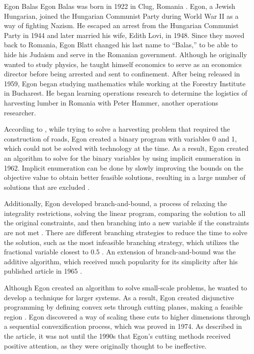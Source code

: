 \begin{refsection}
\begin{pioneerspotlight}{Egon Balas}
Egon Balas was born in 1922 in Clug, Romania \parencite{cornuejols_2019_egon}. Egon, a Jewish Hungarian, joined the Hungarian Communist Party during World War II as a way of fighting Nazism. He escaped an arrest from the Hungarian Communist Party in 1944 and later married his wife, Edith Lovi, in 1948. Since they moved back to Romania, Egon Blatt changed his last name to “Balas,” to be able to hide his Judaism and serve in the Romanian government. Although he originally wanted to study physics, he taught himself economics to serve as an economics director before being arrested and sent to confinement. After being released in 1959, Egon began studying mathematics while working at the Forestry Institute in Bucharest. He began learning operations research to determine the logistics of harvesting lumber in Romania with Peter Hammer, another operations researcher. 

According to \textcite{cornuejols_2019_egon}, while trying to solve a harvesting problem that required the construction of roads, Egon created a binary program with variables 0 and 1, which could not be solved with technology at the time. As a result, Egon created an algorithm to solve for the binary variables by using implicit enumeration in 1962. Implicit enumeration can be done by slowly improving the bounds on the objective value to obtain better feasible solutions, resulting in a large number of solutions that are excluded \parencite{geoffrion_1967_integer}. 

Additionally, Egon developed branch-and-bound, a process of relaxing the integrality restrictions, solving the linear program, comparing the solution to all the original constraints, and then branching into a new variable if the constraints are not met \parencite{gurobioptimization_mixedinteger}. There are different branching strategies to reduce the time to solve the solution, such as the most infeasible branching strategy, which utilizes the fractional variable closest to 0.5 \parencite{huang_2021_branch}. An extension of branch-and-bound was the additive algorithm, which received much popularity for its simplicity after his published article in 1965 \parencite{cornuejols_2019_egon}.

Although Egon created an algorithm to solve small-scale problems, he wanted to develop a technique for larger systems. As a result, Egon created disjunctive programming by defining convex sets through cutting planes, making a feasible region \parencite{cornuejols_2019_egon}. Egon discovered a way of scaling these cuts to higher dimensions through a sequential convexification process, which was proved in 1974. As described in the article, it was not until the 1990s that Egon’s cutting methods received positive attention, as they were originally thought to be ineffective. 


\end{pioneerspotlight}
\end{refsection}
